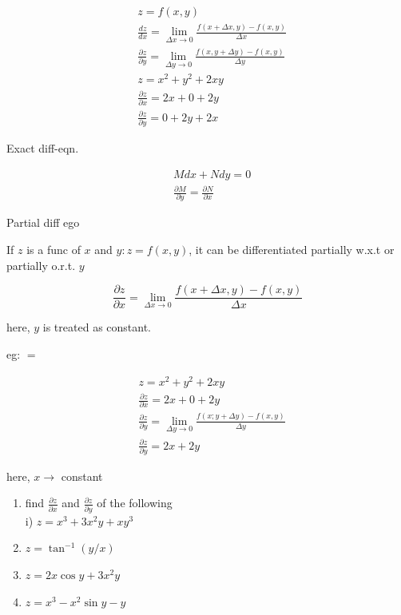 \documentclass[10pt]{article}
\begin{document}
$$
\begin{aligned}
& z=f(x, y) \\
& \frac{d z}{d x}=\lim _{\Delta x \rightarrow 0} \frac{f(x+\Delta x, y)-f(x, y)}{\Delta x} \\
& \frac{\partial z}{\partial y}=\lim _{\Delta y \rightarrow 0} \frac{f(x, y+\Delta y)-f(x, y)}{\Delta y} \\
& z=x^{2}+y^{2}+2 x y \\
& \frac{\partial z}{\partial x}=2 x+0+2 y \\
& \frac{\partial z}{\partial y}=0+2 y+2 x
\end{aligned}
$$

Exact diff-eqn.

$$
\begin{aligned}
& M d x+N d y=0 \\
& \frac{\partial M}{\partial y}=\frac{\partial N}{\partial x}
\end{aligned}
$$

Partial diff ego

If $z$ is a func of $x$ and $y: z=f(x, y)$, it can be differentiated partially w.x.t or partially o.r.t. $y$

$$
\frac{\partial z}{\partial x}=\lim _{\Delta x \rightarrow 0} \frac{f(x+\Delta x, y)-f(x, y)}{\Delta x}
$$

here, $y$ is treated as constant.

eg: $=$

$$
\begin{aligned}
& z=x^{2}+y^{2}+2 x y \\
& \frac{\partial z}{\partial x}=2 x+0+2 y \\
& \frac{\partial z}{\partial y}=\lim _{\Delta y \rightarrow 0} \frac{f(x ; y+\Delta y)-f(x, y)}{\Delta y} \\
& \frac{\partial z}{\partial y}=2 x+2 y
\end{aligned}
$$

here, $x \rightarrow$ constant

\begin{enumerate}
  \item find $\frac{\partial z}{\partial x}$ and $\frac{\partial z}{\partial y}$ of the following\\
i) $z=x^{3}+3 x^{2} y+x y^{3}$
  \item $z=\tan ^{-1}(y / x)$
  \item $z=2 x \cos y+3 x^{2} y$
  \item $z=x^{3}-x^{2} \sin y-y$
\end{enumerate}
\end{document}
